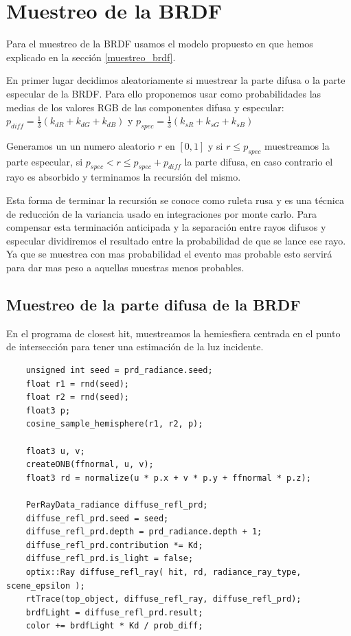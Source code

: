 \clearpage

\section{Muestreo de la BRDF}

Para el muestreo de la BRDF usamos el modelo propuesto en \cite{Lafortune1994} que hemos explicado en la sección \ref{muestreo_brdf}.
\medskip

En primer lugar decidimos aleatoriamente si muestrear la parte difusa o la parte especular de la BRDF. Para ello proponemos usar como probabilidades las medias de los valores RGB de las componentes difusa y especular: $p_{diff} =\frac{1}{3}( k_{dR} + k_{dG} + k_{dB})$ y $p_{spec} =\frac{1}{3}( k_{sR} + k_{sG} + k_{sB})$ 

\medskip

Generamos un un numero aleatorio $r$ en $[0,1]$ y si $r \leq p_{spec}$ muestreamos la parte especular, si $p_{spec} < r \leq p_{spec} + p_{diff}$ la parte difusa, en caso contrario el rayo es absorbido y terminamos la recursión del mismo.

\medskip

Esta forma de terminar la recursión se conoce como ruleta rusa y es una técnica de reducción de la variancia usado en integraciones por monte carlo. Para compensar esta terminación anticipada y la separación entre rayos difusos y especular dividiremos el resultado entre la probabilidad de que se lance ese rayo. Ya que se muestrea con mas probabilidad el evento mas probable esto servirá para dar mas peso a aquellas muestras menos probables.

\subsection{Muestreo de la parte difusa de la BRDF}
En el programa de closest hit, muestreamos la hemiesfiera centrada en el punto de intersección para tener una estimación de la luz incidente.

\begin{lstlisting}
	unsigned int seed = prd_radiance.seed;
	float r1 = rnd(seed);
	float r2 = rnd(seed);
	float3 p;
	cosine_sample_hemisphere(r1, r2, p);
	
	float3 u, v;
	createONB(ffnormal, u, v);
	float3 rd = normalize(u * p.x + v * p.y + ffnormal * p.z);
		
	PerRayData_radiance diffuse_refl_prd;
	diffuse_refl_prd.seed = seed;
	diffuse_refl_prd.depth = prd_radiance.depth + 1;
	diffuse_refl_prd.contribution *= Kd;
	diffuse_refl_prd.is_light = false;
	optix::Ray diffuse_refl_ray( hit, rd, radiance_ray_type, scene_epsilon );
	rtTrace(top_object, diffuse_refl_ray, diffuse_refl_prd);
	brdfLight = diffuse_refl_prd.result;
	color += brdfLight * Kd / prob_diff;
\end{lstlisting}

